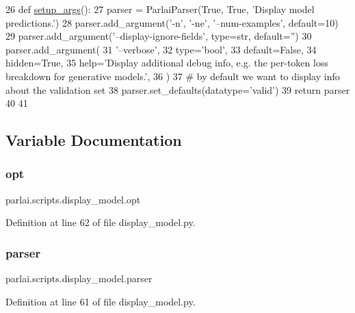 \begin{DoxyCode}
26 \textcolor{keyword}{def }\hyperlink{namespaceparlai_1_1scripts_1_1display__model_a9141f8dde0f690b4d641fe08c193e2b5}{setup\_args}():
27     parser = ParlaiParser(\textcolor{keyword}{True}, \textcolor{keyword}{True}, \textcolor{stringliteral}{'Display model predictions.'})
28     parser.add\_argument(\textcolor{stringliteral}{'-n'}, \textcolor{stringliteral}{'-ne'}, \textcolor{stringliteral}{'--num-examples'}, default=10)
29     parser.add\_argument(\textcolor{stringliteral}{'--display-ignore-fields'}, type=str, default=\textcolor{stringliteral}{''})
30     parser.add\_argument(
31         \textcolor{stringliteral}{'--verbose'},
32         type=\textcolor{stringliteral}{'bool'},
33         default=\textcolor{keyword}{False},
34         hidden=\textcolor{keyword}{True},
35         help=\textcolor{stringliteral}{'Display additional debug info, e.g. the per-token loss breakdown for generative models.'},
36     )
37     \textcolor{comment}{# by default we want to display info about the validation set}
38     parser.set\_defaults(datatype=\textcolor{stringliteral}{'valid'})
39     \textcolor{keywordflow}{return} parser
40 
41 
\end{DoxyCode}


\subsection{Variable Documentation}
\mbox{\label{namespaceparlai_1_1scripts_1_1display__model_aadbab63ca2cd3e3e041342c186b88c85}} 
\subsubsection{\texorpdfstring{opt}{opt}}
{\footnotesize\ttfamily parlai.\+scripts.\+display\+\_\+model.\+opt}



Definition at line 62 of file display\+\_\+model.\+py.

\mbox{\label{namespaceparlai_1_1scripts_1_1display__model_ad9d13419b9305a82345edfdda0421c58}} 
\subsubsection{\texorpdfstring{parser}{parser}}
{\footnotesize\ttfamily parlai.\+scripts.\+display\+\_\+model.\+parser}



Definition at line 61 of file display\+\_\+model.\+py.

